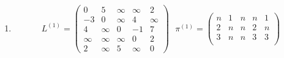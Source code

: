 \documentclass[11pt,a4paper]{article}
\begin{document}
\begin{loesung}
\begin{enumerate}
        \item
        \begin{align*}
            L^{(1)} = 
            \begin{pmatrix}
                0 & 5 & \infty & \infty & 2 \\
                -3 & 0 & \infty & 4 & \infty \\
                4 & \infty & 0 & -1 & 7 \\
                \infty & \infty & \infty & 0 & 2 \\
                2 & \infty & 5 & \infty & 0
            \end{pmatrix}
            \,\,\,\,
            \pi^{(1)} = 
            \begin{pmatrix}
                n & 1 & n & n & 1 \\
                2 & n & n & 2 & n \\
                3 & n & n & 3 & 3 \\

\end{pmatrix}
\end{align*}
\end{enumerate}
\end{loesung}
\end{document}
